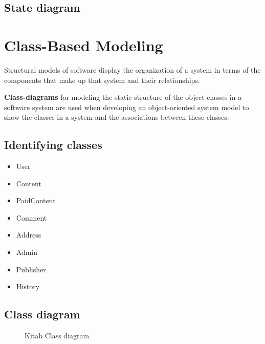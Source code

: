 	

	\subsection{State diagram}

	

   \pagebreak
   
\section{Class-Based Modeling}

Structural models of software display the organization of a system in terms of the components that make up that system and their relationships.

\textbf{Class-diagrams} for modeling the static structure of the object classes in a software system are used when developing an object-oriented system model to show the classes in a system and the associations between these classes.

	\subsection{Identifying classes}

   \begin{itemize}
   \item{User}
   \item{Content}
   \item{PaidContent}
   \item{Comment}
   \item{Address}
   \item{Admin}
   \item{Publisher}
   \item{History}
   \end{itemize}
   
   
	\subsection{Class diagram}
	
		\begin{figure}[t]
		\begin{center}
	
		\caption{Kitab Class diagram}
		\label{dia_class}
	
		\end{center}
		\end{figure}